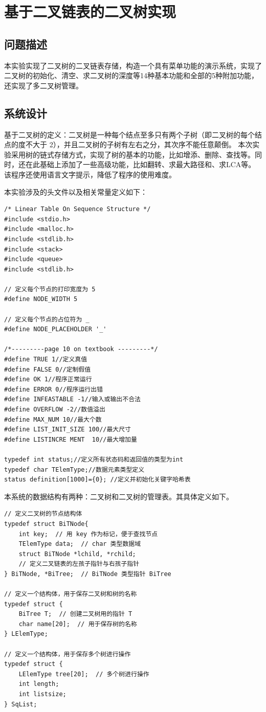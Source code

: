 \documentclass[supercite]{Experimental_Report}
\theoremstyle{definition}
\begin{document}
\section{基于二叉链表的二叉树实现}


\subsection{问题描述}

本实验实现了二叉树的二叉链表存储，构造一个具有菜单功能的演示系统，实现了二叉树的初始化、清空、求二叉树的深度等14种基本功能和全部的5种附加功能，还实现了多二叉树管理。

\subsection{系统设计}
基于二叉树的定义：二叉树是一种每个结点至多只有两个子树（即二叉树的每个结点的度不大于 2），并且二叉树的子树有左右之分，其次序不能任意颠倒。
本次实验采用树的链式存储方式，实现了树的基本的功能，比如增添、删除、查找等。同时，还在此基础上添加了一些高级功能，比如翻转、求最大路径和、求LCA等。该程序还使用语言文字提示，降低了程序的使用难度。

本实验涉及的头文件以及相关常量定义如下：
\begin{lstlisting}[title = 相关常量定义,frame=none]
/* Linear Table On Sequence Structure */
#include <stdio.h>
#include <malloc.h>
#include <stdlib.h>
#include <stack>
#include <queue>
#include <stdlib.h>

// 定义每个节点的打印宽度为 5
#define NODE_WIDTH 5

// 定义每个节点的占位符为 _
#define NODE_PLACEHOLDER '_'

/*---------page 10 on textbook ---------*/
#define TRUE 1//定义真值 
#define FALSE 0//定制假值 
#define OK 1//程序正常运行 
#define ERROR 0//程序运行出错 
#define INFEASTABLE -1//输入或输出不合法 
#define OVERFLOW -2//数值溢出 
#define MAX_NUM 10//最大个数 
#define LIST_INIT_SIZE 100//最大尺寸 
#define LISTINCRE MENT  10//最大增加量 

typedef int status;//定义所有状态码和返回值的类型为int
typedef char TElemType;//数据元素类型定义
status definition[1000]={0}; //定义并初始化关键字哈希表 
\end{lstlisting}
本系统的数据结构有两种：二叉树和二叉树的管理表。其具体定义如下。
\begin{lstlisting}[title = 相关数据结构定义,frame=none]
// 定义二叉树的节点结构体
typedef struct BiTNode{
	int key;  // 用 key 作为标记，便于查找节点
	TElemType data;  // char 类型数据域
	struct BiTNode *lchild, *rchild;  
	// 定义二叉链表的左孩子指针与右孩子指针
} BiTNode, *BiTree;  // BiTNode 类型指针 BiTree

// 定义一个结构体，用于保存二叉树和树的名称
typedef struct {
	BiTree T;  // 创建二叉树用的指针 T
	char name[20];  // 用于保存树的名称
} LElemType;

// 定义一个结构体，用于保存多个树进行操作
typedef struct {
	LElemType tree[20];  // 多个树进行操作
	int length;
	int listsize;
} SqList;
\end{lstlisting}
\end{document}
